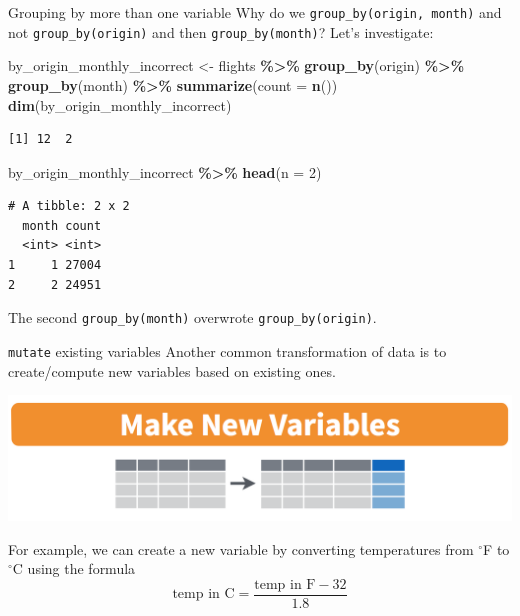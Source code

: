\documentclass[
  ignorenonframetext,
]{beamer}
\newenvironment{Shaded}{\begin{snugshade}}{\end{snugshade}}
\newcommand{\AttributeTok}[1]{\textcolor[rgb]{0.13,0.29,0.53}{#1}}
\newcommand{\DecValTok}[1]{\textcolor[rgb]{0.00,0.00,0.81}{#1}}
\newcommand{\FunctionTok}[1]{\textcolor[rgb]{0.13,0.29,0.53}{\textbf{#1}}}
\newcommand{\NormalTok}[1]{#1}
\newcommand{\OtherTok}[1]{\textcolor[rgb]{0.56,0.35,0.01}{#1}}
\newcommand{\SpecialCharTok}[1]{\textcolor[rgb]{0.81,0.36,0.00}{\textbf{#1}}}
\begin{document}
\begin{frame}[fragile]{Grouping by more than one variable}
\protect\hypertarget{grouping-by-more-than-one-variable-1}{}
Why do we \texttt{group\_by(origin,\ month)} and not
\texttt{group\_by(origin)} and then \texttt{group\_by(month)}? Let's
investigate:

\small

\begin{Shaded}
\begin{Highlighting}[]
\NormalTok{by\_origin\_monthly\_incorrect }\OtherTok{\textless{}{-}}\NormalTok{ flights }\SpecialCharTok{\%\textgreater{}\%} 
  \FunctionTok{group\_by}\NormalTok{(origin) }\SpecialCharTok{\%\textgreater{}\%} 
  \FunctionTok{group\_by}\NormalTok{(month) }\SpecialCharTok{\%\textgreater{}\%} 
  \FunctionTok{summarize}\NormalTok{(}\AttributeTok{count =} \FunctionTok{n}\NormalTok{())}
\FunctionTok{dim}\NormalTok{(by\_origin\_monthly\_incorrect)}
\end{Highlighting}
\end{Shaded}

\begin{verbatim}
[1] 12  2
\end{verbatim}

\begin{Shaded}
\begin{Highlighting}[]
\NormalTok{by\_origin\_monthly\_incorrect }\SpecialCharTok{\%\textgreater{}\%} \FunctionTok{head}\NormalTok{(}\AttributeTok{n =} \DecValTok{2}\NormalTok{)}
\end{Highlighting}
\end{Shaded}

\begin{verbatim}
# A tibble: 2 x 2
  month count
  <int> <int>
1     1 27004
2     2 24951
\end{verbatim}

\normalsize

The second \texttt{group\_by(month)} overwrote
\texttt{group\_by(origin)}.
\end{frame}

\begin{frame}{\texttt{mutate} existing variables}
\protect\hypertarget{mutate-existing-variables}{}
Another common transformation of data is to create/compute new variables
based on existing ones.

\begin{center}\includegraphics[width=0.8\linewidth,height=0.4\textheight]{week3_4} \end{center}

For example, we can create a new variable by converting temperatures
from \(^\circ\)F to \(^\circ\)C using the formula
\[\text{temp in C}=\frac{\text{temp in F}-32}{1.8}\]
\end{frame}
\end{document}
